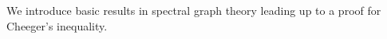 We introduce basic results in spectral graph theory leading up to a proof for Cheeger's inequality.

